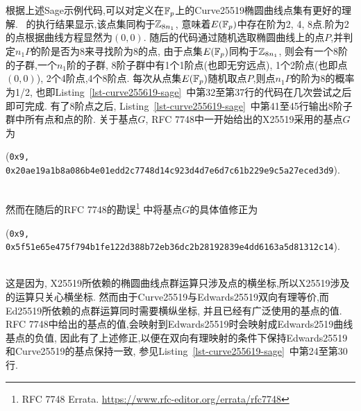 根据上述Sage示例代码,可以对定义在$\mathbb{F}_p$上的Curve25519椭圆曲线点集有更好的理解.
~的执行结果显示,该点集同构于$\mathbb{Z}_{8n_1}$,
意味着$E(\mathbb{F}_p)$中存在阶为2, 4, 8点.阶为2的点根据曲线方程显然为$(0,0)$.
随后的代码通过随机选取椭圆曲线上的点$P$,并判定$n_1P$的阶是否为8来寻找阶为8的点,
由于点集$E(\mathbb{F}_p)$同构于$\mathbb{Z}_{8n_1}$, 则会有一个8阶的子群,一个$n_1$阶的子群,
8阶子群中有1个1阶点(也即无穷远点), 1个2阶点(也即点$(0,0)$), 2个4阶点,4个8阶点.
每次从点集$E(\mathbb{F}_p)$随机取点$P$,则点$n_1P$的阶为8的概率为1/2,
也即Listing~\ref{lst-curve255619-sage}~中第32至第37行的代码在几次尝试之后即可完成.
有了8阶点之后, Listing~\ref{lst-curve255619-sage}~中第41至45行输出8阶子群中所有点和点的阶.
关于基点$G$, RFC 7748中一开始给出的X25519采用的基点$G$为\\
\centerline{(\texttt{0x9, 0x20ae19a1b8a086b4e01edd2c7748d14c923d4d7e6d7c61b229e9c5a27eced3d9}).}\\
然而在随后的RFC 7748的勘误\footnote{
RFC 7748 Errata. \url{https://www.rfc-editor.org/errata/rfc7748}}
中将基点$G$的具体值修正为\\
\centerline{(\texttt{0x9, 0x5f51e65e475f794b1fe122d388b72eb36dc2b28192839e4dd6163a5d81312c14}).}\\
这是因为, X25519所依赖的椭圆曲线点群运算只涉及点的横坐标,所以X25519涉及的运算只关心横坐标.
然而由于Curve25519与Edwards25519双向有理等价,而Ed25519所依赖的点群运算同时需要横纵坐标,
并且已经有广泛使用的基点的值.
RFC 7748中给出的基点的值,会映射到Edwards25519时会映射成Edwards2519曲线基点的负值,
因此有了上述修正,以便在双向有理映射的条件下保持Edwards25519和Curve25519的基点保持一致,
参见Listing~\ref{lst-curve255619-sage}~中第24至第30行.

